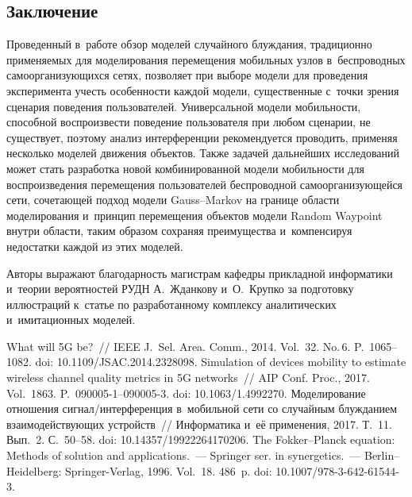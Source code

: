 \begin{multicols}{2}
\section{Заключение}

  Проведенный в~работе обзор моделей случайного блуж\-да\-ния, традиционно 
применяемых для моделирования перемещения мобильных узлов 
в~беспроводных са\-мо\-ор\-га\-ни\-зу\-ющих\-ся сетях, поз\-во\-ля\-ет при выборе модели 
для проведения эксперимента учесть особенности каж\-дой модели, 
существенные с~точ\-ки зрения сценария поведения пользователей. 
Универсальной модели мо\-биль\-ности, способной воспроизвести поведение 
пользователя при любом сценарии, не существует, поэтому анализ 
интерференции рекомендуется проводить, применяя несколько моделей 
движения объектов. Также задачей дальнейших исследований может стать 
разработка новой комбинированной модели мо\-биль\-ности для 
воспроизведения перемещения пользователей беспроводной 
самоорганизующейся сети, сочетающей подход модели Gauss--Markov на 
границе об\-ласти моделирования и~принцип перемещения объектов модели 
Random Waypoint внутри об\-ласти, таким образом сохраняя преимущества 
и~компенсируя недостатки каж\-дой из этих моделей.

\bigskip

Авторы выражают благодарность магистрам кафедры прикладной 
информатики и~тео\-рии вероятностей РУДН А.~Жданкову и~О.~Крупко за 
подготовку иллюстраций к~статье по разработанному комплексу 
аналитических и~имитационных моделей.
  
{\small\frenchspacing
 {%
 \begin{thebibliography}{99}
 What will 5G be?~// IEEE J.~Sel. Area. Comm., 2014. 
Vol.~32. No.\,6. P.~1065--1082. doi: 10.1109/JSAC.2014.2328098.
 Simulation of devices mobility to estimate wireless channel quality 
metrics in 5G networks~// AIP Conf. Proc., 2017. Vol.~1863.  
P.~090005-1--090005-3. doi: 10.1063/1.4992270.
Моделирование отношения сиг\-нал/ин\-тер\-фе\-рен\-ция в~мобильной сети со 
случайным блужданием взаимодействующих устройств~// Информатика и~её 
применения, 2017. Т.~11. Вып.~2. С.~50--58. doi: 10.14357/19922264170206.
 The Fokker--Planck equation: Methods of solution and 
applications.~--- Springer ser. in synergetics.~--- Berlin--Heidelberg: Springer-Verlag, 1996. 
Vol.~18. 486~p. doi: 10.1007/978-3-642-61544-3.


\end{thebibliography}}}
\end{multicols}

